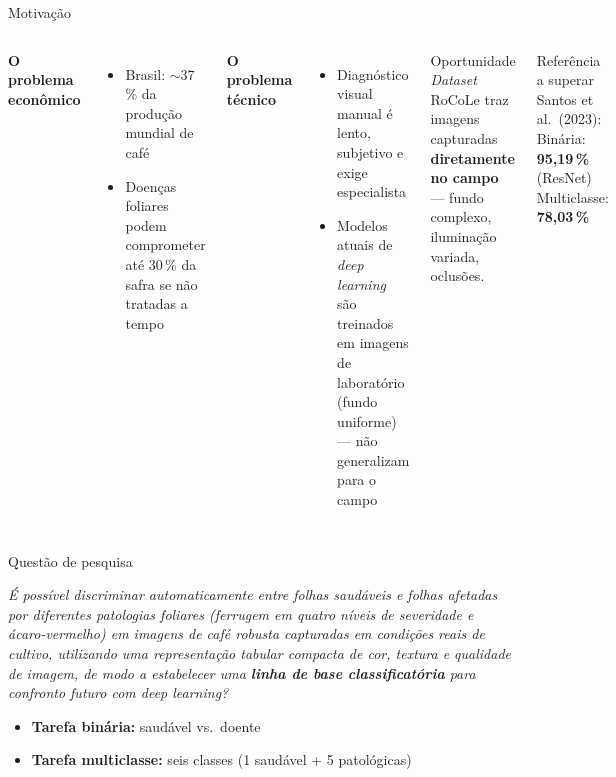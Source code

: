 \documentclass[aspectratio=169,10pt]{beamer}
\begin{document}
\begin{frame}{Motivação}
  \begin{columns}[T]
    \textbf{O problema econômico}
    \begin{itemize}
      \item Brasil: $\sim$37\,\% da produção mundial de café
      \item Doenças foliares podem comprometer até \alert{30\,\% da safra} se não tratadas a tempo
    \end{itemize}

    \vspace{0.6em}
    \textbf{O problema técnico}
    \begin{itemize}
      \item Diagnóstico visual manual é lento, subjetivo e exige especialista
      \item Modelos atuais de \textit{deep learning} são treinados em imagens de laboratório (fundo uniforme) --- \alert{não generalizam para o campo}
    \end{itemize}

    \begin{block}{Oportunidade}
      \textit{Dataset} RoCoLe traz imagens capturadas \textbf{diretamente no campo} --- fundo complexo, iluminação variada, oclusões.
    \end{block}
    \begin{block}{Referência a superar}
      Santos et al.\ (2023): \\
      Binária: \textbf{95,19\,\%} (ResNet) \\
      Multiclasse: \textbf{78,03\,\%}
    \end{block}
  \end{columns}
\end{frame}

\begin{frame}{Questão de pesquisa}
  \vfill
  \begin{block}{}
    \centering
    \textit{É possível discriminar automaticamente entre folhas saudáveis e folhas afetadas por diferentes patologias foliares (ferrugem em quatro níveis de severidade e ácaro-vermelho) em imagens de café robusta capturadas em condições reais de cultivo, utilizando uma representação tabular compacta de cor, textura e qualidade de imagem, de modo a estabelecer uma \textbf{linha de base classificatória} para confronto futuro com \textit{deep learning}?}
  \end{block}
  \vspace{0.8em}
  \begin{itemize}
    \item \textbf{Tarefa binária:} saudável vs.\ doente
    \item \textbf{Tarefa multiclasse:} seis classes (1 saudável + 5 patológicas)
  \end{itemize}
  \vfill
\end{frame}
\end{document}
